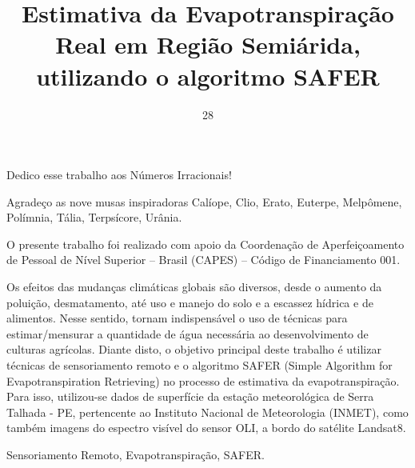 \documentclass[fleqn]{icat-ufal}
\title{Estimativa da Evapotranspiração Real em Região Semiárida, utilizando o algoritmo SAFER}
\date{28}{02}{2023}
\begin{document}

\begin{dedication} 

Dedico esse trabalho aos Números Irracionais!

\end{dedication}

\begin{acknowledgement} 


\noindent
Agradeço as nove musas inspiradoras Calíope, Clio, Erato, Euterpe, Melpômene,
Polímnia, Tália, Terpsícore, Urânia.

%
%
\vspace{2\baselineskip}\noindent
O presente trabalho foi realizado com apoio da Coordenação de Aperfeiçoamento 
de Pessoal de Nível Superior -- Brasil (CAPES) -- Código de Financiamento 001.

\end{acknowledgement}

\begin{Resumo}


Os efeitos das mudanças climáticas globais são diversos, desde o aumento da poluição, desmatamento, até uso e manejo do solo e a escassez hídrica e de alimentos. Nesse sentido, tornam indispensável o uso de técnicas para estimar/mensurar a quantidade de água necessária ao desenvolvimento de culturas agrícolas. Diante disto, o objetivo principal deste trabalho é utilizar técnicas de sensoriamento remoto e o algoritmo SAFER (Simple Algorithm for Evapotranspiration Retrieving) no processo de estimativa da evapotranspiração. Para isso, utilizou-se dados de superfície da estação meteorológica de Serra Talhada - PE, pertencente ao Instituto Nacional de Meteorologia (INMET), como também imagens do espectro visível do sensor OLI, a bordo do satélite Landsat8.


\PalavrasChave Sensoriamento Remoto, Evapotranspiração, SAFER.

\end{Resumo}
\end{document}
